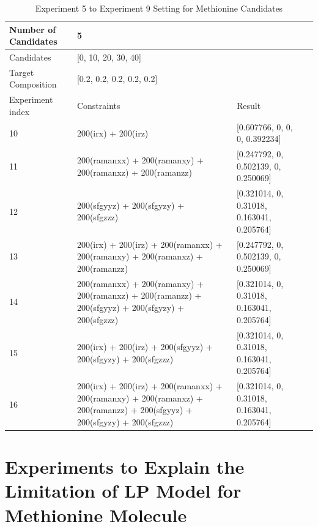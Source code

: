 \begin{table}\tiny \label{tab:4.3}
\begin{center}
\begin{tabular}{| l | p{3cm} | l | l |}
\hline
Number of Candidates & \multicolumn{2}{l|}{5} \\ \hline
Candidates & \multicolumn{2}{l|}{[0, 10, 20, 30, 40]} \\ \hline
Target Composition & \multicolumn{2}{l|}{[0.2, 0.2, 0.2, 0.2, 0.2]} \\ \hline
Experiment index & Constraints & Result  \\ \hline
10 & 200(irx) + 200(irz)  & [0.607766, 0, 0, 0, 0.392234]  \\ \hline
11 & 200(ramanxx) + 200(ramanxy) + 200(ramanxz) + 200(ramanzz)  & [0.247792, 0, 0.502139, 0, 0.250069]  \\ \hline
12 & 200(sfgyyz) + 200(sfgyzy) + 200(sfgzzz) & [0.321014, 0, 0.31018, 0.163041, 0.205764]  \\ \hline
13 & 200(irx) + 200(irz) + 200(ramanxx) + 200(ramanxy) + 200(ramanxz) + 200(ramanzz) & [0.247792, 0, 0.502139, 0, 0.250069]  \\ \hline
14 & 200(ramanxx) + 200(ramanxy) + 200(ramanxz) + 200(ramanzz) + 200(sfgyyz) + 200(sfgyzy) + 200(sfgzzz) & [0.321014, 0, 0.31018, 0.163041, 0.205764]  \\ \hline
15 & 200(irx) + 200(irz) + 200(sfgyyz) + 200(sfgyzy) + 200(sfgzzz) & [0.321014, 0, 0.31018, 0.163041, 0.205764]  \\ \hline
16 & 200(irx) + 200(irz) + 200(ramanxx) + 200(ramanxy) + 200(ramanxz) + 200(ramanzz) + 200(sfgyyz) + 200(sfgyzy) + 200(sfgzzz) & [0.321014, 0, 0.31018, 0.163041, 0.205764]  \\ \hline
\end{tabular} 
\end{center}
\caption{Experiment 5 to Experiment 9 Setting for Methionine Candidates}
\end{table}

\section{Experiments to Explain the Limitation of LP Model for Methionine Molecule}

